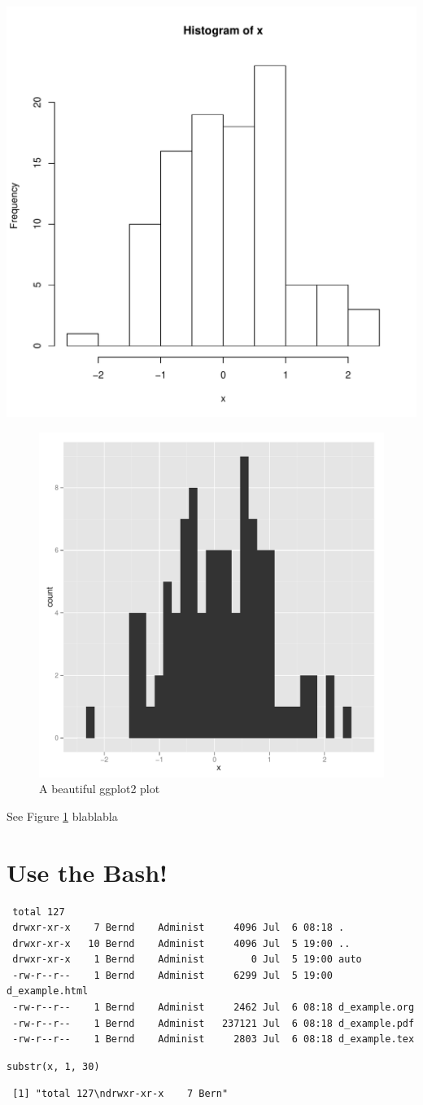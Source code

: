 \documentclass[11pt]{article}
\begin{document}
\includegraphics[width=.9\linewidth]{../fig/f_pub_histogram.pdf}





\begin{figure}[htb]
\centering
\includegraphics[width = 0.2\linewidth, clip]{../fig/f_pub_histogram_gg.pdf}
\caption{\label{f:ggplot}A beautiful ggplot2 plot}
\end{figure}

See Figure \ref{f:ggplot} blablabla
\section{Use the Bash!}
\label{sec-3}




\begin{verbatim}
 total 127
 drwxr-xr-x    7 Bernd    Administ     4096 Jul  6 08:18 .
 drwxr-xr-x   10 Bernd    Administ     4096 Jul  5 19:00 ..
 drwxr-xr-x    1 Bernd    Administ        0 Jul  5 19:00 auto
 -rw-r--r--    1 Bernd    Administ     6299 Jul  5 19:00 d_example.html
 -rw-r--r--    1 Bernd    Administ     2462 Jul  6 08:18 d_example.org
 -rw-r--r--    1 Bernd    Administ   237121 Jul  6 08:18 d_example.pdf
 -rw-r--r--    1 Bernd    Administ     2803 Jul  6 08:18 d_example.tex
\end{verbatim}



\lstset{language=R}
\begin{lstlisting}
substr(x, 1, 30)
\end{lstlisting}

\begin{verbatim}
 [1] "total 127\ndrwxr-xr-x    7 Bern"
\end{verbatim}
\end{document}
